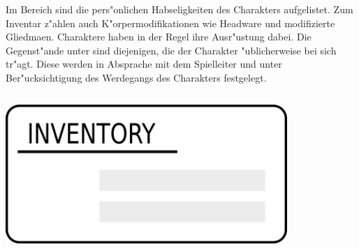 \begin{column}[l]{0.55}
    Im Bereich  sind die pers"onlichen Habseligkeiten des Charakters aufgelistet. Zum Inventar z"ahlen auch K"orpermodifikationen wie Headware und modifizierte Gliedma\3en. Charaktere haben in der Regel ihre Ausr"ustung dabei. Die Gegenst"ande unter  sind diejenigen, die der Charakter "ublicherweise bei sich tr"agt. Diese werden in Absprache mit dem Spielleiter und unter Ber"ucksichtigung des Werdegangs des Charakters festgelegt.
\end{column}
\begin{column}[r]{0.45}
    \centering
    \includegraphics[width=0.80\textwidth]{images/character_inventory.png}
\end{column}
